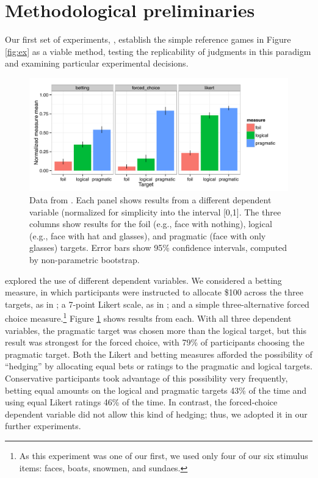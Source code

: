 \section{Methodological preliminaries}
\label{sec:prelims}

Our first set of experiments, , establish the simple reference games in Figure \ref{fig:ex} as a viable method, testing the replicability of judgments in this paradigm and examining particular experimental decisions. 

\begin{figure}[t]
  \centering
  \includegraphics[width=6in]{../plots/1-prelims-dv.pdf}
  \caption{\label{fig:prelims-dv} Data from . Each panel shows results from a different dependent variable (normalized for simplicity into the interval [0,1]. The three columns show results for the foil (e.g., face with nothing), logical (e.g., face with hat and glasses), and pragmatic (face with only glasses) targets. Error bars show 95\% confidence intervals, computed by non-parametric bootstrap.}
\end{figure}

 explored the use of different dependent variables. We considered a betting measure, in which participants were instructed to allocate \$100 across the three targets, as in ; a 7-point Likert scale, as in ; and a simple three-alternative forced choice measure.\footnote{As this experiment was one of our first, we used only four of our six stimulus items: faces, boats, snowmen, and sundaes.} Figure \ref{fig:prelims-dv} shows results from each. With all three dependent variables, the pragmatic target was chosen more than the logical target, but this result was strongest for the forced choice, with 79\% of participants choosing the pragmatic target. Both the Likert and betting measures afforded the possibility of ``hedging'' by allocating equal bets or ratings to the pragmatic and logical targets. Conservative participants took advantage of this possibility very frequently, betting equal amounts on the logical and pragmatic targets 43\% of the time and using equal Likert ratings 46\% of the time. In contrast, the forced-choice dependent variable did not allow this kind of hedging; thus, we adopted it in our further experiments.  

